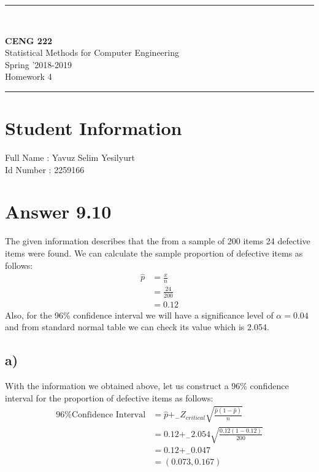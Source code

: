 \documentclass[12pt]{article}
\newcommand{\HRule}{\rule{\linewidth}{1mm}}
\begin{document}
\noindent
\HRule \\[3mm]
\begin{flushright}

                                         \LARGE \textbf{CENG 222}  \\[4mm]
                                         \Large Statistical Methods for Computer Engineering \\[4mm]
                                        \normalsize      Spring '2018-2019 \\
                                           \Large   Homework 4 \\
\end{flushright}
\HRule

\section*{Student Information }
Full Name : Yavuz Selim Yesilyurt \\
Id Number : 2259166 

\section*{Answer 9.10}
The given information describes that the from a sample of 200 items 24 defective items were found. We can calculate the sample proportion of defective items as follows: 
\begin{align*}
\hat{p} &= \frac{x}{n} \\
		&= \frac{24}{200} \\
		&= 0.12
\end{align*}
Also, for the 96\% confidence interval we will have a significance level of $\alpha = 0.04$ and from standard normal table we can check its value which is 2.054. \\

\subsection*{a)}
With the information we obtained above, let us construct a 96\% confidence interval for the proportion of defective items as follows: 
\begin{align*}
\text{96\% Confidence Interval} &= \hat{p} +_- Z_{critical}\sqrt{\frac{\hat{p}(1-\hat{p})}{n}} \\
&= 0.12 +_- 2.054\sqrt{\frac{0.12(1-0.12)}{200}} \\
&= 0.12 +_- 0.047 \\
&= (0.073, 0.167)
\end{align*}
\end{document}

